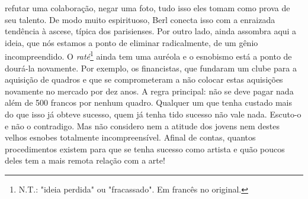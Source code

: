refutar uma colaboração, negar uma foto, tudo isso eles tomam como prova
de seu talento. De modo muito espirituoso, Berl conecta isso com a
enraizada tendência à ascese, típica dos parisienses. Por outro lado,
ainda assombra aqui a ideia, que nós estamos a ponto de eliminar
radicalmente, de um gênio incompreendido. O \emph{raté}\footnote{N.T.:
  "ideia perdida" ou "fracassado". Em francês no original.} ainda tem
uma auréola e o esnobismo está a ponto de dourá-la novamente. Por
exemplo, os financistas, que fundaram um clube para a aquisição de
quadros e que se comprometeram a não colocar estas aquisições novamente
no mercado por dez anos. A regra principal: não se deve pagar nada além
de 500 francos por nenhum quadro. Qualquer um que tenha custado mais do
que isso já obteve sucesso, quem já tenha tido sucesso não vale nada.
Escuto-o e não o contradigo. Mas não considero nem a atitude dos jovens
nem destes velhos esnobes totalmente incompreensível. Afinal de contas,
quantos procedimentos existem para que se tenha sucesso como artista e
quão poucos deles tem a mais remota relação com a arte!


